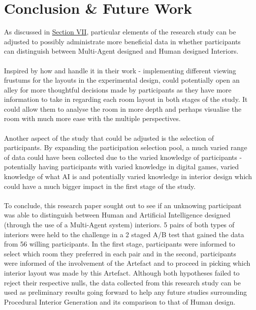 \section{Conclusion \& Future Work}

As discussed in \hyperref[issues]{Section VII}, particular elements of the research study can be adjusted to possibly administrate more beneficial data in whether participants can distinguish between Multi-Agent designed and Human designed Interiors.
\\
\\
Inspired by how  \cite{constrained-layouts} and  \cite{make-it-home} handle it in their work - implementing different viewing frustums for the layouts in the experimental design, could potentially open an alley for more thoughtful decisions made by participants as they have more information to take in regarding each room layout in both stages of the study. It could allow them to analyse the room in more depth and perhaps visualise the room with much more ease with the multiple perspectives.
\\
\\
Another aspect of the study that could be adjusted is the selection of participants. By expanding the participation selection pool, a much varied range of data could have been collected due to the varied knowledge of participants - potentially having participants with varied knowledge in digital games, varied knowledge of what AI is and potentially varied knowledge in interior design which could have a much bigger impact in the first stage of the study.
\\
\\
To conclude, this research paper sought out to see if an unknowing participant was able to distinguish between Human and Artificial Intelligence designed (through the use of a Multi-Agent system) interiors. 5 pairs of both types of interiors were held to the challenge in a 2 staged A/B test that gained the data from 56 willing participants.
In the first stage, participants were informed to select which room they preferred in each pair and in the second, participants were informed of the involvement of the Artefact and to proceed in picking which interior layout was made by this Artefact.
Although both hypotheses failed to reject their respective nulls, the data collected from this research study can be used as preliminary results going forward to help any future studies surrounding Procedural Interior Generation and its comparison to that of Human design.